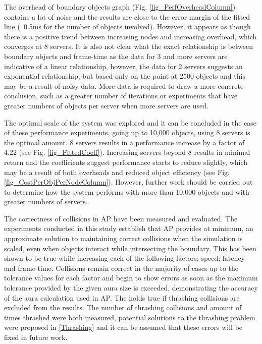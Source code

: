 The overhead of boundary objects graph (Fig. \ref{fig_PerfOverheadColumn}) contains a lot of noise and the results are close to the error margin of the fitted line (~0.5ms for the number of objects involved). However, it appears as though there is a positive trend between increasing nodes and increasing overhead, which converges at 8 servers. It is also not clear what the exact relationship is between boundary objects and frame-time as the data for 3 and more servers are indicative of a linear relationship, however, the data for 2 servers suggests an exponential relationship, but based only on the point at 2500 objects and this may be a result of noisy data. More data is required to draw a more concrete conclusion, such as a greater number of iterations or experiments that have greater numbers of objects per server when more servers are used.

The optimal scale of the system was explored and it can be concluded in the case of these performance experiments, going up to 10,000 objects, using 8 servers is the optimal amount. 8 servers results in a performance increase by a factor of 4.22 (see Fig. \ref{fig_FittedCoeff}). Increasing servers beyond 8 results in minimal return and the coefficients suggest performance starts to reduce slightly, which may be a result of both overheads and reduced object efficiency (see Fig. \ref{fig_CostPerObjPerNodeColumn}). However, further work should be carried out to determine how the system performs with more than 10,000 objects and with greater numbers of servers.

The correctness of collisions in AP have been measured and evaluated. The experiments conducted in this study establish that AP provides at minimum, an approximate solution to maintaining correct collisions when the simulation is scaled, even when objects interact while intersecting the boundary. This has been shown to be true while increasing each of the following factors: speed; latency and frame-time. Collisions remain correct in the majority of cases up to the tolerance values for each factor and begin to show errors as soon as the maximum tolerance provided by the given aura size is exceeded, demonstrating the accuracy of the aura calculation used in AP. The holds true if thrashing collisions are excluded from the results. The number of thrashing collisions and amount of times thrashed were both measured, potential solutions to the thrashing problem were proposed in \ref{Thrashing} and it can be assumed that these errors will be fixed in future work.

